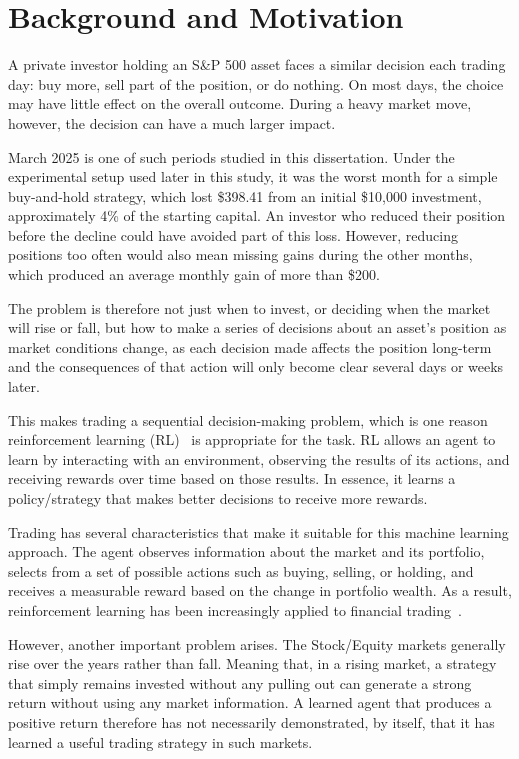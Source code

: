 \section{Background and Motivation}

A private investor holding an S\&P 500 asset faces a similar decision
each trading day: buy more, sell part of the position, or do nothing. On
most days, the choice may have little effect on the overall outcome.
During a heavy market move, however, the decision can have a much larger
impact.

March 2025 is one of such periods studied in this dissertation. Under
the experimental setup used later in this study, it was the worst month
for a simple buy-and-hold strategy, which lost \$398.41 from an initial
\$10,000 investment, approximately 4\% of the starting capital. An investor who reduced their position before the decline could
have avoided part of this loss. However, reducing positions too often
would also mean missing gains during the other months, which produced an
average monthly gain of more than \$200.

The problem is therefore not just when to invest, or deciding when the
market will rise or fall, but how to make a series of decisions about an
asset's position as market conditions change, as each decision made
affects the position long-term and the consequences of that action will
only become clear several days or weeks later.

This makes trading a sequential decision-making problem, which is one
reason reinforcement learning (RL)~\cite{sutton2018} is appropriate for the task. RL
allows an agent to learn by interacting with an environment, observing
the results of its actions, and receiving rewards over time based on
those results. In essence, it learns a policy/strategy that makes better
decisions to receive more rewards.

Trading has several characteristics that make it suitable for this
machine learning approach. The agent observes information about the
market and its portfolio, selects from a set of possible actions such as
buying, selling, or holding, and receives a measurable reward based on
the change in portfolio wealth. As a result, reinforcement learning has
been increasingly applied to financial trading~\cite{moody2001, deng2017, fischer2018}.

However, another important problem arises. The Stock/Equity markets
generally rise over the years rather than fall. Meaning that, in a
rising market, a strategy that simply remains invested without any
pulling out can generate a strong return without using any market
information. A learned agent that produces a positive return therefore
has not necessarily demonstrated, by itself, that it has learned a
useful trading strategy in such markets.

